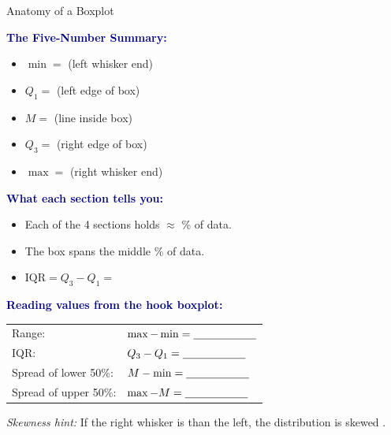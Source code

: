\documentclass[10pt]{article}
\begin{document}
\vspace{0.08in}

\boxguard
\begin{notesbox}{Anatomy of a Boxplot}
\small
\begin{multicols}{2}

\textbf{\textcolor{navy}{The Five-Number Summary:}}
\begin{itemize}[itemsep=3pt]
  \item $\min = $ \blank{2cm} (left whisker end)
  \item $Q_1 = $ \blank{2cm} (left edge of box)
  \item $M = $ \blank{2cm} (line inside box)
  \item $Q_3 = $ \blank{2cm} (right edge of box)
  \item $\max = $ \blank{2cm} (right whisker end)
\end{itemize}

\vspace{6pt}
\textbf{\textcolor{navy}{What each section tells you:}}
\begin{itemize}[itemsep=3pt]
  \item Each of the 4 sections holds $\approx$ \blank{1.2cm}\% of data.
  \item The box spans the middle \blank{1.2cm}\% of data.
  \item $\text{IQR} = Q_3 - Q_1 = $ \blank{2cm}
\end{itemize}

\columnbreak

\textbf{\textcolor{navy}{Reading values from the hook boxplot:}}

\vspace{4pt}
\renewcommand{\arraystretch}{1.5}
\begin{tabularx}{\columnwidth}{@{} l X @{}}
Range: & $\max - \min = \blank{2cm}$ \\
IQR:   & $Q_3 - Q_1 = \blank{2cm}$ \\
Spread of lower 50\%: & $M - \min = \blank{2cm}$ \\
Spread of upper 50\%: & $\max - M = \blank{2cm}$ \\
\end{tabularx}

\vspace{6pt}
\textit{Skewness hint:} If the right whisker is \blank{2.5cm} than the left,
the distribution is skewed \blank{2cm}.

\end{multicols}
\end{notesbox}
\end{document}
